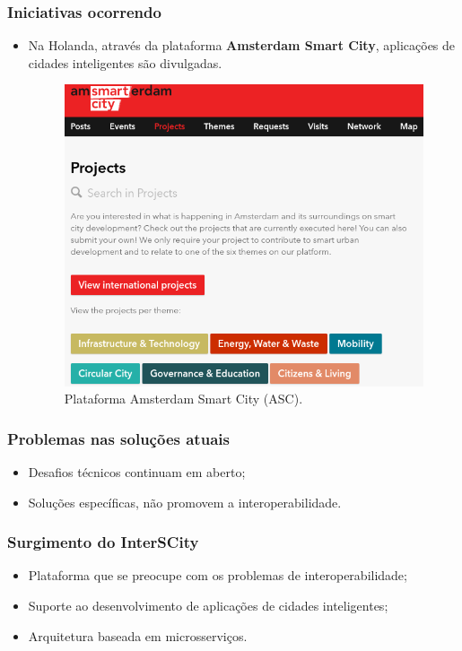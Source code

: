 \documentclass{beamer}
\begin{document}
    \begin{frame}
        \frametitle{Iniciativas ocorrendo}
        \begin{itemize}
            \item Na Holanda, através da plataforma \textbf{Amsterdam Smart City},
                aplicações de cidades inteligentes são divulgadas.

            \begin{figure}
                \includegraphics[scale=0.25]{figures/asc.png}
                \caption{Plataforma Amsterdam Smart City (ASC).}
            \end{figure}
        \end{itemize}
    \end{frame}

    \begin{frame}
        \frametitle{Problemas nas soluções atuais}
        \begin{itemize}
            \item Desafios técnicos continuam em aberto;
            \item Soluções específicas, não promovem a interoperabilidade.
        \end{itemize}
    \end{frame}

    \begin{frame}
        \frametitle{Surgimento do InterSCity}
        \begin{itemize}
            \item Plataforma que se preocupe com os problemas de interoperabilidade;
            \item Suporte ao desenvolvimento de aplicações de cidades inteligentes;
            \item Arquitetura baseada em microsserviços.
        \end{itemize}
    \end{frame}
\end{document}
